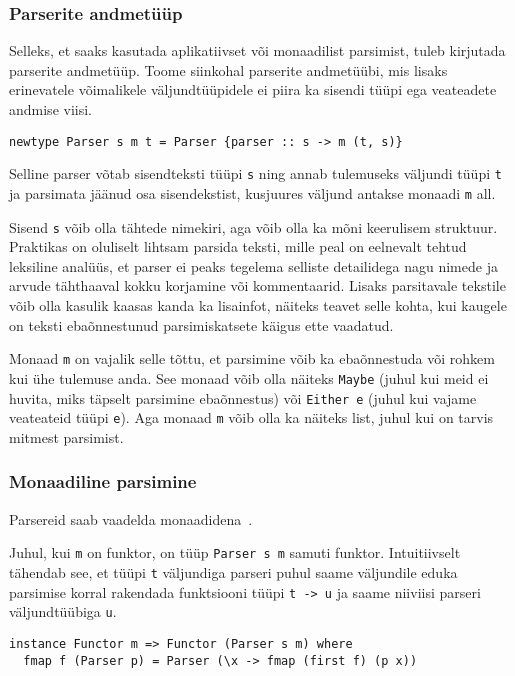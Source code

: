 \documentclass[12pt]{article}
\begin{document}
      \subsubsection{Parserite andmetüüp}\label{parserityyp}
        Selleks, et saaks kasutada aplikatiivset või monaadilist parsimist, tuleb kirjutada parserite andmetüüp. Toome siinkohal parserite andmetüübi, mis lisaks erinevatele võimalikele väljundtüüpidele ei piira ka sisendi tüüpi ega veateadete andmise viisi.

        \begin{verbatim}newtype Parser s m t = Parser {parser :: s -> m (t, s)}\end{verbatim}

        Selline parser võtab sisendteksti tüüpi \verb!s! ning annab tulemuseks väljundi tüüpi \verb!t! ja parsimata jäänud osa sisendekstist, kusjuures väljund antakse monaadi \verb!m! all.

        Sisend \verb!s! võib olla tähtede nimekiri, aga võib olla ka mõni keerulisem struktuur. Praktikas on oluliselt lihtsam parsida teksti, mille peal on eelnevalt tehtud leksiline analüüs, et parser ei peaks tegelema selliste detailidega nagu nimede ja arvude tähthaaval kokku korjamine või kommentaarid. Lisaks parsitavale tekstile võib olla kasulik kaasas kanda ka lisainfot, näiteks teavet selle kohta, kui kaugele on teksti ebaõnnestunud parsimiskatsete käigus ette vaadatud.

        Monaad \verb!m! on vajalik selle tõttu, et parsimine võib ka ebaõnnestuda või rohkem kui ühe tulemuse anda. See monaad võib olla näiteks \verb!Maybe! (juhul kui meid ei huvita, miks täpselt parsimine ebaõnnestus) või \verb!Either e! (juhul kui vajame veateateid tüüpi \verb!e!). Aga monaad \verb!m! võib olla ka näiteks list, juhul kui on tarvis mitmest parsimist.
      \subsubsection{Monaadiline parsimine}
        Parsereid saab vaadelda monaadidena~\cite{Mon}.

        Juhul, kui \verb!m! on funktor, on tüüp \verb!Parser s m! samuti funktor. Intuitiivselt tähendab see, et tüüpi \verb!t! väljundiga parseri puhul saame väljundile eduka parsimise korral rakendada funktsiooni tüüpi \verb!t -> u! ja saame niiviisi parseri väljundtüübiga \verb!u!.

        \begin{verbatim}instance Functor m => Functor (Parser s m) where
  fmap f (Parser p) = Parser (\x -> fmap (first f) (p x))\end{verbatim}
\end{document}
